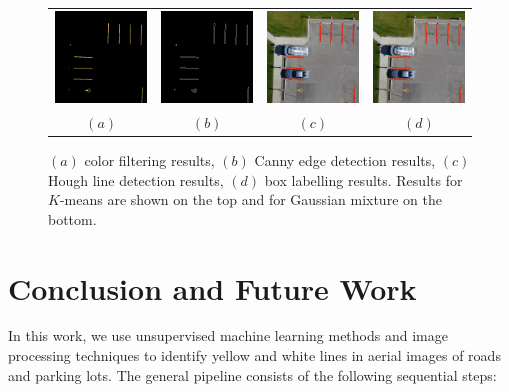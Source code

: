 \documentclass{m2pi}
\begin{document}
\begin{figure}[htp]
\begin{tabular}{cccc}
\includegraphics[width=3.5cm]{figures/Masked_Lot1G.jpg}&
\includegraphics[width=3.5cm]{figures/Edge_Lot1G.jpg}&
\includegraphics[width=3.5cm]{figures/Detected_Lot1G.jpg}&
\includegraphics[width=3.5cm]{figures/Boxed_line_Lot1G.jpg}\\
$(a)$ & $(b)$ & $(c)$ & $(d)$
\end{tabular}
\caption{$(a)$ color filtering results, $(b)$ Canny edge detection results,
$(c)$ Hough line detection results, $(d)$ box labelling results. 
Results for $K$-means are shown on the top and for Gaussian mixture on the
bottom.}
\label{lot1result}
\end{figure}



\section{Conclusion and Future Work}

In this work, we use unsupervised machine learning methods and image processing techniques to identify yellow and white lines in aerial images of roads and parking lots. The general pipeline consists of the following sequential steps:
\end{document}
